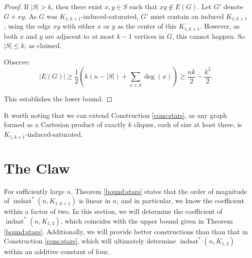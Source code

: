 \documentclass[12pt]{amsart}
\theoremstyle{plain}
\theoremstyle{definition}
\theoremstyle{remark}
\newcommand{\sis}[2]{\ensuremath{{\operatorname{indsat}}^*(#1,#2)}\xspace}
\newcommand{\claw}{\ensuremath{K_{1,3}}\xspace}
\begin{document}
\begin{proof}
If $|S| > k$, then there exist $x,y \in S$ such that $xy \notin E(G)$.  Let $G'$ denote $G + xy$.  As $G$ was $K_{1,k+1}$-induced-saturated, $G'$ must contain an induced $K_{1,k+1}$, using the edge $xy$ with either $x$ or $y$ as the center of this $K_{1,k+1}$.  However, as both $x$ and $y$ are adjacent to at most $k - 1$ vertices in $G$, this cannot happen.  So $|S| \le k$, as claimed.

Observe:  $$
|E(G)| \ge  \frac{1}{2}\left(k(n - |S|) + \sum\limits_{x \in S} \deg(x)\right) \ge \frac{nk}{2} - \frac{k^2}{2}.$$

This establishes the lower bound.
\end{proof}

It worth noting that we can extend Construction \ref{cons:stars}, as any graph formed as a Cartesian product of exactly $k$ cliques, each of size at least three, is $K_{1,k+1}$-induced-saturated.


%
%


\section{The Claw}\label{sec:claw}


For sufficiently large $n$, Theorem \ref{bound:stars} states that the order of magnitude of $\sis{n}{K_{1,k+1}}$ is linear in $n$, and in particular, we know the coefficient within a factor of two.  In this section, we will determine the coefficient of $\sis{n}{K_{1,3}}$, which coincides with the upper bound given in Theorem \ref{bound:stars}.  Additionally, we will provide better constructions than than that in Construction \ref{cons:stars}, which will ultimately determine $\sis{n}{K_{1,3}}$ within an additive constant of four.

\end{document}
